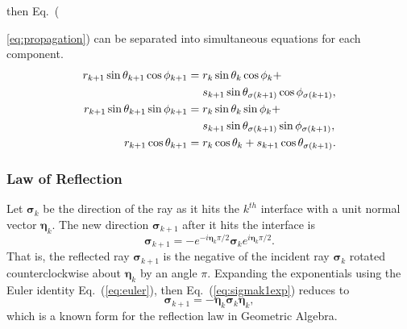 \documentclass[a4paper,twocolumn,superscriptaddress]{revtex4-1}
\begin{document}
then Eq.~({\ref{eq:propagation}) can be separated into simultaneous equations 
for each component.
\begin{subequations}
  \label{eq:propagationcomponents}
  \begin{align}
    \label{eq:propagationcomponente1}
    r_{k+1} \sin \theta_{k+1} \cos \phi_{k+1} &= r_k  \sin \theta_k \cos \phi_{k} + \notag
    \\& \quad \ 
    s_{k+1} \sin \theta_{\sigma (k+1)} \cos \phi_{\sigma (k+1)} , 
    \\
    \label{eq:propagationcomponente2} 
    r_{k+1} \sin \theta_{k+1} \sin \phi_{k+1} &=     r_k \sin \theta_k \sin \phi_{k} +\notag
    \\& \quad \ 
    s_{k+1} \sin \theta_{\sigma (k+1)} \sin \phi_{\sigma (k+1)} , 
    \\
    \label{eq:propagationcomponente3} 
    r_{k+1} \cos \theta_{k+1} &= 
    r_k \cos \theta_k + s_{k+1} \cos \theta_{\sigma (k+1)} .  
  \end{align}
\end{subequations}



\subsubsection{Law of Reflection} \label{sec:lawofreflection}

Let $\bm \sigma_k$ be the direction of the ray as it hits the $k^{th}$ interface 
with a unit normal vector $\bm \eta_k$. The new direction $\bm \sigma_{k+1}$ 
after it hits the interface is
\cite{doranBook}
  \begin{equation} 
    \label{eq:sigmak1exp}
    \bm \sigma_{k+1} = 
    - e^{-i \bm \eta_k \pi/2} \bm \sigma_k e^{i \bm \eta_k \pi/2} .
\end{equation}
That is, the reflected ray $\bm \sigma_{k+1}$ is the negative of the incident 
ray $\bm \sigma_k$ rotated counterclockwise about $\bm \eta_k$ by an angle 
$\pi$. Expanding the exponentials using the Euler identity Eq.~(\ref{eq:euler}),
then Eq.~(\ref{eq:sigmak1exp}) reduces to
\begin{equation} 
    \label{eq:gareflect}
    \bm \sigma_{k+1} = 
    - \bm \eta_k \bm \sigma_k \bm \eta_k ,
\end{equation}
which is a known form for the reflection law in Geometric Algebra. 
\cite{doranBook}

}
\end{document}
